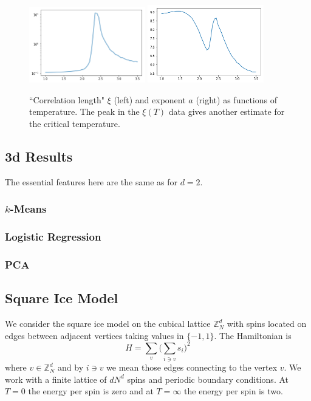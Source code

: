 \documentclass[11pt]{article}
\begin{document}
\begin{figure}[h]
    \centering
    \includegraphics[width=0.45\textwidth]{ising_images/integrated_PI_xi}
    \includegraphics[width=0.45\textwidth]{ising_images/integrated_PI_a}
    \caption{``Correlation length" $\xi$ (left) and exponent $a$ (right) as functions of temperature. The peak in the $\xi(T)$ data gives another estimate for the critical temperature.}
    \label{fig:Xi_a}
\end{figure}



\subsection{3d Results}
The essential features here are the same as for $d=2$.

\subsubsection{$k$-Means}

\subsubsection{Logistic Regression}

\subsubsection{PCA}



\newpage
\subsection{Square Ice Model}
We consider the square ice model on the cubical lattice $\mathbb{Z}_N^d$ with spins located on edges between adjacent vertices taking values in $\{{-1},1\}$. The Hamiltonian is
\begin{equation}
    H = \sum_v\Big(\sum_{i\ni v}s_i\Big)^2
\end{equation}
where $v\in\mathbb{Z}_N^d$ and by $i\ni v$ we mean those edges connecting to the vertex $v$. We work with a finite lattice of $dN^d$ spins and periodic boundary conditions. At $T=0$ the energy per spin is zero and at $T=\infty$ the energy per spin is two.
\end{document}
